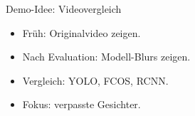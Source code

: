 \begin{frame}{Demo-Idee: Videovergleich}
\small
\begin{itemize}
    \item Früh: Originalvideo zeigen.
    \item Nach Evaluation: Modell-Blurs zeigen.
    \item Vergleich: YOLO, FCOS, RCNN.
    \item Fokus: verpasste Gesichter.
\end{itemize}
\end{frame}
